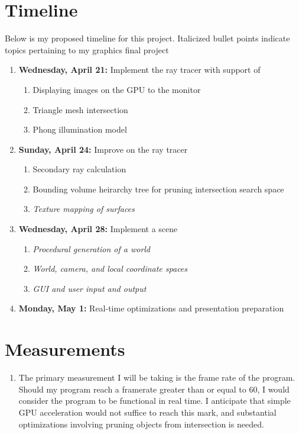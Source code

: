 \documentclass[11pt]{article}
\begin{document}
\section{Timeline}
Below is my proposed timeline for this project. Italicized bullet points indicate topics pertaining
to my graphics final project
\begin{enumerate}
    \item \textbf{Wednesday, April 21:} Implement the ray tracer with support of
          \begin{enumerate}
              \item Displaying images on the GPU to the monitor
              \item Triangle mesh intersection
              \item Phong illumination model
          \end{enumerate}
    \item \textbf{Sunday, April 24:} Improve on the ray tracer
          \begin{enumerate}
              \item Secondary ray calculation
              \item Bounding volume heirarchy tree for pruning intersection search space
              \item \textit{Texture mapping of surfaces}
          \end{enumerate}
    \item \textbf{Wednesday, April 28:} Implement a scene
          \begin{enumerate}
              \item \textit{Procedural generation of a world}
              \item \textit{World, camera, and local coordinate spaces}
              \item \textit{GUI and user input and output}
          \end{enumerate}
    \item \textbf{Monday, May 1:} Real-time optimizations and presentation preparation
\end{enumerate}

\section{Measurements}
\begin{enumerate}
    \item The primary measurement I will be taking is the frame rate of the program. Should my
          program reach a framerate greater than or equal to 60, I would consider the program to be functional
          in real time. I anticipate that simple GPU acceleration would not suffice to reach this mark,
          and substantial optimizations involving pruning objects from intersection is needed.
\end{enumerate}
\end{document}
